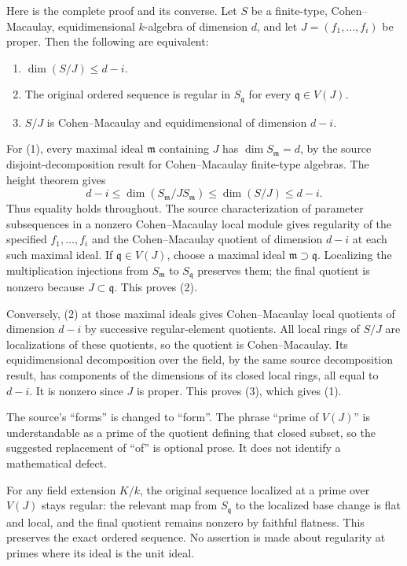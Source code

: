 Here is the complete proof and its converse. Let \(S\) be a finite-type, Cohen--Macaulay, equidimensional \(k\)-algebra of dimension \(d\), and let \(J=(f_1,\ldots,f_i)\) be proper. Then the following are equivalent:

\begin{enumerate}
\def\labelenumi{\arabic{enumi}.}
\tightlist
\item
  \(\dim(S/J)\leq d-i\).
\item
  The original ordered sequence is regular in \(S_{\mathfrak q}\) for every \(\mathfrak q\in V(J)\).
\item
  \(S/J\) is Cohen--Macaulay and equidimensional of dimension \(d-i\).
\end{enumerate}

For (1), every maximal ideal \(\mathfrak m\) containing \(J\) has \(\dim S_{\mathfrak m}=d\), by the source disjoint-decomposition result for Cohen--Macaulay finite-type algebras. The height theorem gives \[
d-i\leq\dim(S_{\mathfrak m}/JS_{\mathfrak m})\leq\dim(S/J)\leq d-i.
\] Thus equality holds throughout. The source characterization of parameter subsequences in a nonzero Cohen--Macaulay local module gives regularity of the specified \(f_1,\ldots,f_i\) and the Cohen--Macaulay quotient of dimension \(d-i\) at each such maximal ideal. If \(\mathfrak q\in V(J)\), choose a maximal ideal \(\mathfrak m\supset\mathfrak q\). Localizing the multiplication injections from \(S_{\mathfrak m}\) to \(S_{\mathfrak q}\) preserves them; the final quotient is nonzero because \(J\subset\mathfrak q\). This proves (2).

Conversely, (2) at those maximal ideals gives Cohen--Macaulay local quotients of dimension \(d-i\) by successive regular-element quotients. All local rings of \(S/J\) are localizations of these quotients, so the quotient is Cohen--Macaulay. Its equidimensional decomposition over the field, by the same source decomposition result, has components of the dimensions of its closed local rings, all equal to \(d-i\). It is nonzero since \(J\) is proper. This proves (3), which gives (1).

The source's ``forms'' is changed to ``form''. The phrase ``prime of \(V(J)\)'' is understandable as a prime of the quotient defining that closed subset, so the suggested replacement of ``of'' is optional prose. It does not identify a mathematical defect.

For any field extension \(K/k\), the original sequence localized at a prime over \(V(J)\) stays regular: the relevant map from \(S_{\mathfrak q}\) to the localized base change is flat and local, and the final quotient remains nonzero by faithful flatness. This preserves the exact ordered sequence. No assertion is made about regularity at primes where its ideal is the unit ideal.

